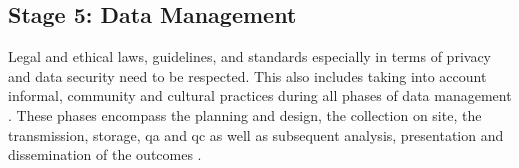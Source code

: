 \subsection{Stage 5: Data Management}\label{subsec:stage5_design}

Legal and ethical laws, guidelines, and standards especially in terms of privacy and data security need to be respected. This also includes taking into account informal, community and cultural practices during all phases of data management \autocite{ifrcCommunityBasedSurveillanceGuiding2017}. These phases encompass the planning and design, the collection on site, the transmission, storage, \acrfull{qa} and \acrfull{qc} as well as subsequent analysis, presentation and dissemination of the outcomes \autocite{fraislCitizenScienceEnvironmental2022}.\newline
